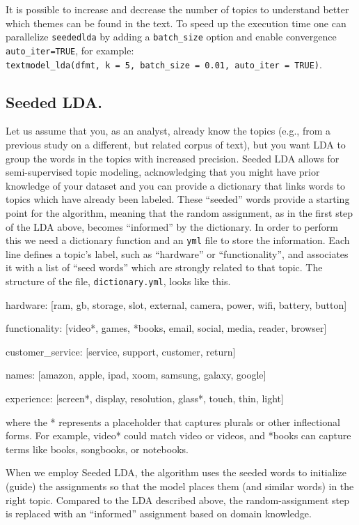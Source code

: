 It is possible to increase and decrease the number of topics to understand
better which themes can be found in the text. To speed up the execution
time one can parallelize \texttt{seededlda} by adding a
\texttt{batch\_size} option and enable convergence
\texttt{auto\_iter=TRUE}, for example:
\texttt{textmodel\_lda(dfmt,\ k\ =\ 5,\ batch\_size\ =\ 0.01,\ auto\_iter\ =\ TRUE)}.

\subsection{Seeded LDA.}\label{seeded-lda.}

Let us assume that you, as an analyst, already know the topics (e.g., from
a previous study on a different, but related corpus of text), but you want
LDA to group the words in the topics with increased precision. Seeded
LDA allows for semi-supervised topic modeling, acknowledging that you
might have prior knowledge of your dataset and you can provide a
dictionary that links words to topics which have already been labeled.
These ``seeded'' words provide a starting point for the algorithm,
meaning that the random assignment, as in the first step of the LDA above, becomes ``informed'' by the dictionary. In
order to perform this we need a dictionary function and an \texttt{yml}
file to store the information. Each line defines a topic's label, such as
``hardware'' or ``functionality'', and associates it with a list of
``seed words'' which are strongly related to that topic. The structure
of the file, \texttt{dictionary.yml}, looks like this.

hardware: {[}ram, gb, storage, slot, external, camera, power, wifi,
battery, button{]}

functionality: {[}video*, games, *books, email, social, media, reader,
browser{]}

customer\_service: {[}service, support, customer, return{]}

names: {[}amazon, apple, ipad, xoom, samsung, galaxy, google{]}

experience: {[}screen*, display, resolution, glass*, touch, thin,
light{]}

where the * represents a placeholder that captures plurals or other
inflectional forms. For example, video* could match video or videos, and
*books can capture terms like books, songbooks, or notebooks.

When we employ Seeded LDA, the algorithm uses the seeded words to
initialize (guide) the assignments so that the model places them
(and similar words) in the right topic. Compared to the LDA described above, the random-assignment step is replaced with an
``informed'' assignment based on domain knowledge.

